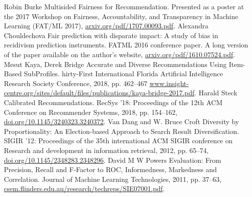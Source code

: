 \documentclass[a4paper,article,14pt]{extarticle}
\begin{document}


\tableofcontents
\pagebreak


\pagebreak


\pagebreak


\pagebreak


\pagebreak


\pagebreak


\pagebreak



\pagebreak

\begin{thebibliography}{1}
 Robin Burke \flqq Multisided Fairness for Recommendation\frqq. Presented as a poster at the 2017 Workshop on Fairness, Accountability, and Transparency in Machine Learning (FAT/ML 2017), \href{https://arxiv.org/pdf/1707.00093.pdf}{arxiv.org/pdf/1707.00093.pdf}.
 Alexandra Chouldechova \flqq Fair prediction with disparate impact: A study of bias in recidivism prediction instruments\frqq. FATML 2016 conference paper. A long version of the paper available on the author's website, \href{https://arxiv.org/pdf/1610.07524.pdf}{arxiv.org/pdf/1610.07524.pdf}.
 Mesut Kaya, Derek Bridge \flqq Accurate and Diverse Recommendations Using Item-Based SubProfiles\frqq. 	hirty-First International Florida Artificial Intelligence Research Society Conference, 2018, pp. 462--467 \href{https://www.insight-centre.org/sites/default/files/publications/kaya-bridge-2017.pdf}{www.insight-centre.org/sites/default/files/publications/kaya-bridge-2017.pdf}.
 Harald Steck \flqq Calibrated Recommendations\frqq. RecSys '18: Proceedings of the 12th ACM Conference on Recommender Systems, 2018, pp. 154--162, \href{https://doi.org/10.1145/3240323.3240372}{doi.org/10.1145/3240323.3240372}.
 Van Dang and W. Bruce Croft \flqq Diversity by Proportionality: An Election-based Approach to Search Result Diversification\frqq. SIGIR '12: Proceedings of the 35th international ACM SIGIR conference on Research and development in information retrieval, 2012, pp. 65--74, \href{https://doi.org/10.1145/2348283.2348296}{doi.org/10.1145/2348283.2348296}.
 David M W Powers \flqq Evaluation: From Precision, Recall and F-Factor to ROC, Informedness, Markedness and Correlation\frqq. Journal of Machine Learning Technologies, 2011, pp. 37--63, \href{https://csem.flinders.edu.au/research/techreps/SIE07001.pdf}{csem.flinders.edu.au/research/techreps/SIE07001.pdf}.

\end{thebibliography}
\end{document}
